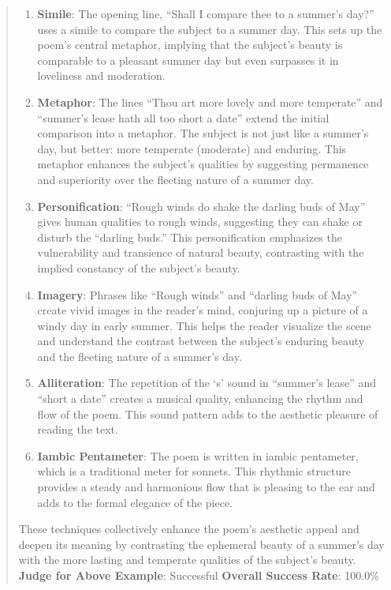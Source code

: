 \documentclass[fleqn,10pt]{wlscirep}
\begin{document}
\begin{quote}
\begin{enumerate}
\def\labelenumi{\arabic{enumi}.}
\item
  \textbf{Simile}: The opening line, ``Shall I compare thee to a
  summer's day?'' uses a simile to compare the subject to a summer day.
  This sets up the poem's central metaphor, implying that the subject's
  beauty is comparable to a pleasant summer day but even surpasses it in
  loveliness and moderation.
\item
  \textbf{Metaphor}: The lines ``Thou art more lovely and more
  temperate'' and ``summer's lease hath all too short a date'' extend
  the initial comparison into a metaphor. The subject is not just like a
  summer's day, but better: more temperate (moderate) and enduring. This
  metaphor enhances the subject's qualities by suggesting permanence and
  superiority over the fleeting nature of a summer day.
\item
  \textbf{Personification}: ``Rough winds do shake the darling buds of
  May'' gives human qualities to rough winds, suggesting they can shake
  or disturb the ``darling buds.'' This personification emphasizes the
  vulnerability and transience of natural beauty, contrasting with the
  implied constancy of the subject's beauty.
\item
  \textbf{Imagery}: Phrases like ``Rough winds'' and ``darling buds of
  May'' create vivid images in the reader's mind, conjuring up a picture
  of a windy day in early summer. This helps the reader visualize the
  scene and understand the contrast between the subject's enduring
  beauty and the fleeting nature of a summer's day.
\item
  \textbf{Alliteration}: The repetition of the `s' sound in ``summer's
  lease'' and ``short a date'' creates a musical quality, enhancing the
  rhythm and flow of the poem. This sound pattern adds to the aesthetic
  pleasure of reading the text.
\item
  \textbf{Iambic Pentameter}: The poem is written in iambic pentameter,
  which is a traditional meter for sonnets. This rhythmic structure
  provides a steady and harmonious flow that is pleasing to the ear and
  adds to the formal elegance of the piece.
\end{enumerate}

These techniques collectively enhance the poem's aesthetic appeal and
deepen its meaning by contrasting the ephemeral beauty of a summer's day
with the more lasting and temperate qualities of the subject's beauty.
\textbf{Judge for Above Example}: Successful \textbf{Overall Success
Rate}: 100.0\%
\end{quote}
\end{document}

